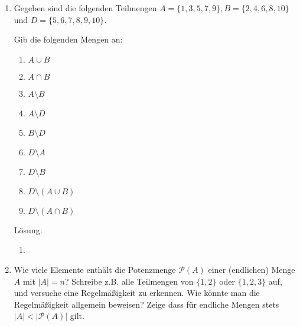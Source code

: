 \documentclass[../main.tex]{subfiles}
\begin{document}
\begin{enumerate}
	\item Gegeben sind die folgenden Teilmengen \(A = \{ 1, 3, 5, 7, 9 \}, B = \{2, 4, 6, 8, 10 \} \) und
	      \(D = \{ 5,6,7,8,9,10\} \).

	      Gib die folgenden Mengen an:
	      \begin{multicols}{3}
		      \begin{enumerate}
			      \item \(A \cup B \)
			      \item \(A \cap B \)
			      \item \(A \setminus B \)
			      \item \(A \setminus D \)
			      \item \(B \setminus D \)
			      \item \(D \setminus A \)
			      \item \(D \setminus B \)
			      \item \(D \setminus(A \cup B) \)
			      \item \(D \setminus(A \cap B) \)
		      \end{enumerate}
	      \end{multicols}

	      Lösung:
	      \begin{enumerate}
		      \item
	      \end{enumerate}
	\item Wie viele Elemente enthält die Potenzmenge \( \mathcal{P}(A) \) einer (endlichen)
	      Menge \(A \) mit \( |A| = n \)? Schreibe z.B. alle Teilmengen von \( \{1,2\} \) oder
	      \( \{1,2,3\} \) auf, und versuche eine Regelmäßigkeit zu erkennen.
	      Wie könnte man die Regelmäßigkeit allgemein beweisen?
	      Zeige dass für endliche Mengen stets \( |A| < |\mathcal{P}(A)| \) gilt.


\end{enumerate}
\end{document}
